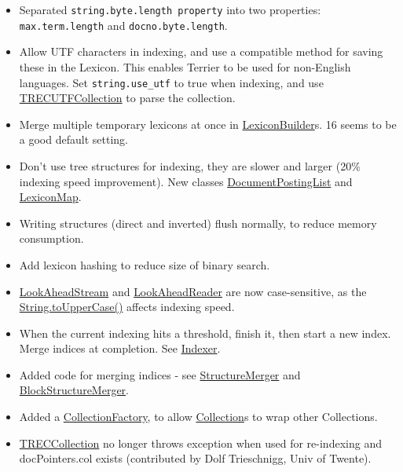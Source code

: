 \begin{itemize}
\tightlist
\item
  Separated \texttt{string.byte.length\ property} into two properties:
  \texttt{max.term.length} and \texttt{docno.byte.length}.
\item
  Allow UTF characters in indexing, and use a compatible method for
  saving these in the Lexicon. This enables Terrier to be used for
  non-English languages. Set \texttt{string.use\_utf} to true when
  indexing, and use
  \href{javadoc/org/terrier/indexing/TRECUTFCollection.html}{TRECUTFCollection}
  to parse the collection.
\item
  Merge multiple temporary lexicons at once in
  \href{javadoc/org/terrier/structures/indexing/LexiconBuilder.html}{LexiconBuilder}s.
  16 seems to be a good default setting.
\item
  Don't use tree structures for indexing, they are slower and larger
  (20\% indexing speed improvement). New classes
  \href{javadoc/org/terrier/structures/indexing/DocumentPostingList.html}{DocumentPostingList}
  and
  \href{javadoc/org/terrier/structures/indexing/LexiconMap.html}{LexiconMap}.
\item
  Writing structures (direct and inverted) flush normally, to reduce
  memory consumption.
\item
  Add lexicon hashing to reduce size of binary search.
\item
  \href{javadoc/org/terrier/utility/LookAheadStream.html}{LookAheadStream}
  and
  \href{javadoc/org/terrier/utility/LookAheadReader.html}{LookAheadReader}
  are now case-sensitive, as the
  \href{http://java.sun.com/j2se/1.5.0/docs/api/java/lang/String.html\#toUpperCase()}{String.toUpperCase()}
  affects indexing speed.
\item
  When the current indexing hits a threshold, finish it, then start a
  new index. Merge indices at completion. See
  \href{javadoc/org/terrier/indexing/Indexer.html}{Indexer}.
\item
  Added code for merging indices - see
  \href{javadoc/org/terrier/structures/merging/StructureMerger.html}{StructureMerger}
  and
  \href{javadoc/org/terrier/structures/merging/StructureMerger.html}{BlockStructureMerger}.
\item
  Added a
  \href{javadoc/org/terrier/indexing/CollectionFactory.html}{CollectionFactory},
  to allow
  \href{javadoc/org/terrier/indexing/Collection.html}{Collection}s to
  wrap other Collections.
\item
  \href{javadoc/org/terrier/indexing/TRECCollection.html}{TRECCollection}
  no longer throws exception when used for re-indexing and
  docPointers.col exists (contributed by Dolf Trieschnigg, Univ of
  Twente).
\end{itemize}

